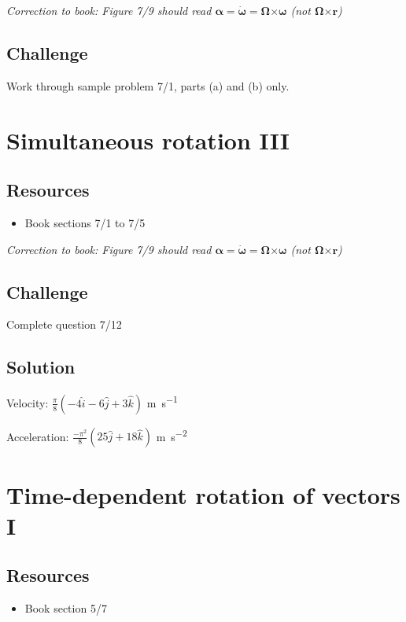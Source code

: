 \emph{Correction to book: Figure 7/9 should read $\bm{\alpha} = \bm{\dot{\omega}} = \bm{\Omega} \bm{\times} \bm{\omega}$ (not $\bm{\Omega} \bm{\times} \bm{r}$)}

\subsection*{Challenge}
Work through sample problem 7/1, parts (a) and (b) only.




\newpage
\section{Simultaneous rotation III}

\subsection*{Resources}
\begin{itemize}
    \item Book sections 7/1 to 7/5
\end{itemize}

\emph{Correction to book: Figure 7/9 should read $\bm{\alpha} = \bm{\dot{\omega}} = \bm{\Omega} \bm{\times} \bm{\omega}$ (not $\bm{\Omega} \bm{\times} \bm{r}$)}

\subsection*{Challenge}
Complete question 7/12


\subsection*{Solution}
Velocity: $\frac{\pi}{8}(-4 \hat{i} - 6 \hat{j} + 3 \hat{k})$ \si{\meter\per\second}

Acceleration: $\frac{-\pi^2}{8}(25 \hat{j} + 18 \hat{k})$ \si{\meter\per\square\second}




\newpage
\section{Time-dependent rotation of vectors I}

\subsection*{Resources}
\begin{itemize}
    \item Book section 5/7
\end{itemize}

